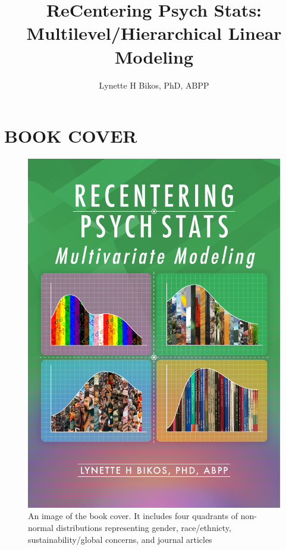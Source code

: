 \documentclass[
  english,
]{book}
\title{ReCentering Psych Stats: Multilevel/Hierarchical Linear Modeling}
\author{Lynette H Bikos, PhD, ABPP}
\date{}
\begin{document}
\maketitle

{
\setcounter{tocdepth}{1}
\tableofcontents
}
\hypertarget{book-cover}{%
\chapter*{BOOK COVER}\label{book-cover}}

\begin{figure}
\centering
\includegraphics{images/ReC_multivariate_bkcvr.png}
\caption{An image of the book cover. It includes four quadrants of non-normal distributions representing gender, race/ethnicty, sustainability/global concerns, and journal articles}
\end{figure}
\end{document}
